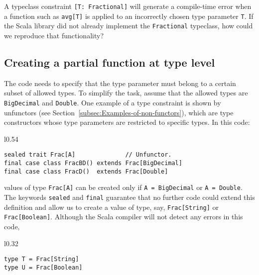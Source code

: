 A typeclass constraint \lstinline![T: Fractional]! will generate
a compile-time error when a function such as \lstinline!avg[T]! is
applied to an incorrectly chosen type parameter \lstinline!T!. If
the Scala library did not already implement the \lstinline!Fractional!
typeclass, how could we reproduce that functionality?

\subsection{Creating a partial function at type level}

The code needs to specify that the type parameter must belong to a
certain subset of allowed types. To simplify the task, assume that
the allowed types are \lstinline!BigDecimal! and \lstinline!Double!.
One example of a type constraint is shown by unfunctors
(see Section~\ref{subsec:Examples-of-non-functors}), which are type
constructors whose type parameters are restricted to specific types.
In this code:

\begin{wrapfigure}{l}{0.54\columnwidth}%
\vspace{-0.6\baselineskip}
\begin{lstlisting}
sealed trait Frac[A]              // Unfunctor.
final case class FracBD() extends Frac[BigDecimal]
final case class FracD()  extends Frac[Double]
\end{lstlisting}

\vspace{-0.75\baselineskip}
\end{wrapfigure}%

\noindent values of type \lstinline!Frac[A]! can be created only
if \lstinline!A = BigDecimal! or \lstinline!A = Double!. The keywords
\lstinline!sealed! and \lstinline!final! guarantee that no further
code could extend this definition and allow us to create a value of
type, say, \lstinline!Frac[String]! or \lstinline!Frac[Boolean]!.
Although the Scala compiler will not detect any errors in this code,

\begin{wrapfigure}{l}{0.32\columnwidth}%
\vspace{-0.75\baselineskip}
\begin{lstlisting}
type T = Frac[String]
type U = Frac[Boolean]
\end{lstlisting}

\vspace{-1\baselineskip}
\end{wrapfigure}%

